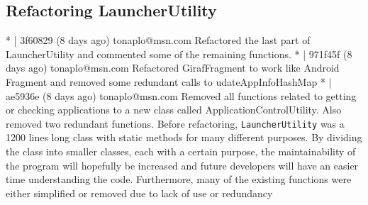 \subsection{Refactoring LauncherUtility}\label{sect:sprint4:refactoring}

* | 3f60829 (8 days ago) tonaplo@msn.com Refactored the last part of LauncherUtility and commented some of the remaining functions.
* | 971f45f (8 days ago) tonaplo@msn.com Refactored GirafFragment to work like Android Fragment and removed some redundant calls to udateAppInfoHashMap
* | ae5936e (8 days ago) tonaplo@msn.com Removed all functions related to getting or checking applications to a new class called ApplicationControlUtility. Also removed two redundant functions.
Before refactoring, \lstinline!LauncherUtility! was  a 1200 lines long class with static methods for many different purposes.
By dividing the class into smaller classes, each with a certain purpose, the maintainability of the program will hopefully be increased and future developers will have an easier time understanding the code.
Furthermore, many of the existing functions were either simplified or removed due to lack of use or redundancy